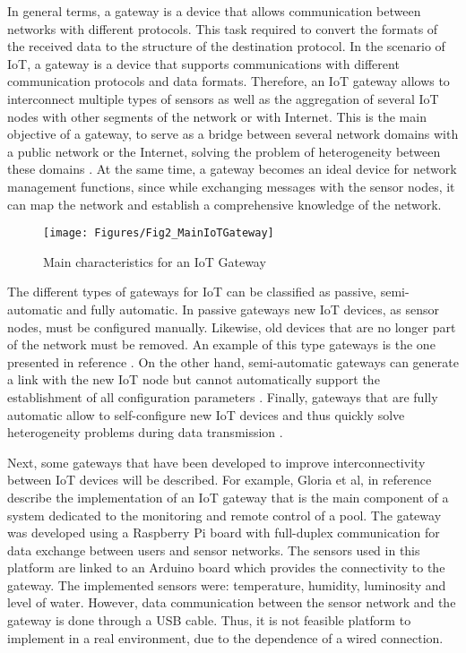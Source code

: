 In general terms, a gateway is a device that allows communication between networks with different protocols. This task required to convert the formats of the received data to the structure of the destination protocol. In the scenario of IoT, a gateway is a device that supports communications with different communication protocols and data formats. Therefore, an IoT gateway allows to interconnect multiple types of sensors as well as the aggregation of several IoT nodes with other segments of the network or with Internet. This is the main objective of a gateway, to serve as a bridge between several network domains with a public network or the Internet, solving the problem of heterogeneity between these domains \cite{Zachariah2015}. At the same time, a gateway becomes an ideal device for network management functions, since while exchanging messages with the sensor nodes, it can map the network and establish a comprehensive knowledge of the network. 

\begin{figure}[ht!]
\centering
\texttt{[image: Figures/Fig2\_MainIoTGateway]}
\caption{Main characteristics for an IoT Gateway}
\label{ch5_fig:2}       %
\end{figure}

The different types of gateways for IoT can be classified as passive, semi-automatic and fully automatic. In passive gateways new IoT devices, as sensor nodes, must be configured manually. Likewise, old devices that are no longer part of the network must be removed. An example of this type gateways is the one presented in reference \cite{Emara2009}. On the other hand, semi-automatic gateways can generate a link with the new IoT node but cannot automatically support the establishment of all configuration parameters \cite{Wu2013}. Finally, gateways that are fully automatic allow to self-configure new IoT devices and thus quickly solve heterogeneity problems during data transmission \cite{Kang2017}.

Next, some gateways that have been developed to improve interconnectivity between IoT devices will be described. For example, Gloria et al, in reference \cite{Gloria2017} describe the implementation of an IoT gateway that is the main component of a system dedicated to the monitoring and remote control of a pool. The gateway was developed using a Raspberry Pi board with full-duplex communication for data exchange between users and sensor networks. The sensors used in this platform are linked to an Arduino board which provides the connectivity to the gateway. The implemented sensors were: temperature, humidity, luminosity and level of water. However, data communication between the sensor network and the gateway is done through a USB cable. Thus, it is not feasible platform to implement in a real environment, due to the dependence of a wired connection.

